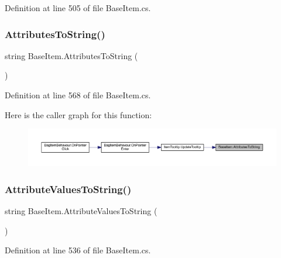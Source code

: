Definition at line 505 of file Base\+Item.\+cs.

\mbox{\label{class_base_item_afd59d6b5168af724211f54ad3692ea73}} 
\subsubsection{\texorpdfstring{AttributesToString()}{AttributesToString()}}
{\footnotesize\ttfamily string Base\+Item.\+Attributes\+To\+String (\begin{DoxyParamCaption}{ }\end{DoxyParamCaption})}



Definition at line 568 of file Base\+Item.\+cs.

Here is the caller graph for this function\+:
\nopagebreak
\begin{figure}[H]
\begin{center}
\leavevmode
\includegraphics[width=350pt]{class_base_item_afd59d6b5168af724211f54ad3692ea73_icgraph}
\end{center}
\end{figure}
\mbox{\label{class_base_item_a414dcba1b98b9d67f2254b885049bfca}} 
\subsubsection{\texorpdfstring{AttributeValuesToString()}{AttributeValuesToString()}}
{\footnotesize\ttfamily string Base\+Item.\+Attribute\+Values\+To\+String (\begin{DoxyParamCaption}{ }\end{DoxyParamCaption})}



Definition at line 536 of file Base\+Item.\+cs.

\mbox{\label{class_base_item_ad820521a001d82fc3f52b2483226efde}} 
